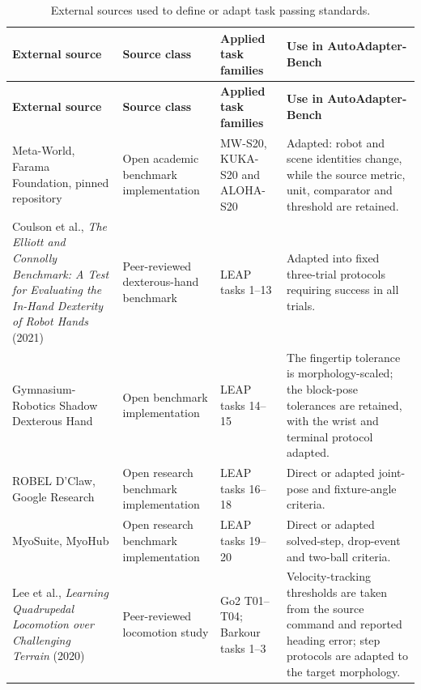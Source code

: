 \clearpage
\begin{landscape}
\begingroup
\scriptsize
{}
\renewcommand{\arraystretch}{1.12}
\begin{longtable}{@{}>{\raggedright\arraybackslash}p{50mm}>{\raggedright\arraybackslash}p{34mm}>{\raggedright\arraybackslash}p{39mm}>{\raggedright\arraybackslash}p{85mm}@{}}
\caption{External sources used to define or adapt task passing standards.}
\label{tab:appendix-standard-sources}\\
\toprule
\textbf{External source} & \textbf{Source class} & \textbf{Applied task families} & \textbf{Use in AutoAdapter-Bench} \\
\midrule
\endfirsthead
\toprule
\textbf{External source} & \textbf{Source class} & \textbf{Applied task families} & \textbf{Use in AutoAdapter-Bench} \\
\midrule
\endhead
\midrule
\endfoot
\bottomrule
\endlastfoot
Meta-World, Farama Foundation, pinned repository
\citep{yu2020metaworld,farama2026metaworld} &
Open academic benchmark implementation &
MW-S20, KUKA-S20 and ALOHA-S20 &
Adapted: robot and scene identities change, while the source metric, unit,
comparator and threshold are retained. \\

Coulson et al., \emph{The Elliott and Connolly Benchmark: A Test for Evaluating
the In-Hand Dexterity of Robot Hands} (2021)
\citep{coulson2021elliott} &
Peer-reviewed dexterous-hand benchmark &
LEAP tasks 1--13 &
Adapted into fixed three-trial protocols requiring success in all trials. \\

Gymnasium-Robotics Shadow Dexterous Hand
\citep{delazcano2026gymnasiumrobotics} &
Open benchmark implementation &
LEAP tasks 14--15 &
The fingertip tolerance is morphology-scaled; the block-pose tolerances are
retained, with the wrist and terminal protocol adapted. \\

ROBEL D'Claw, Google Research
\citep{ahn2020robel,robel2020software} &
Open research benchmark implementation &
LEAP tasks 16--18 &
Direct or adapted joint-pose and fixture-angle criteria. \\

MyoSuite, MyoHub
\citep{caggiano2022myosuite,myohub2026myosuite} &
Open research benchmark implementation &
LEAP tasks 19--20 &
Direct or adapted solved-step, drop-event and two-ball criteria. \\

Lee et al., \emph{Learning Quadrupedal Locomotion over Challenging Terrain}
(2020) \citep{lee2020quadrupedal} &
Peer-reviewed locomotion study &
Go2 T01--T04; Barkour tasks 1--3 &
Velocity-tracking thresholds are taken from the source command and reported
heading error; step protocols are adapted to the target morphology. \\


\end{longtable}
\end{landscape}
